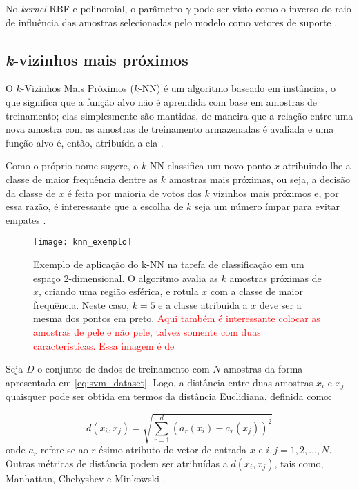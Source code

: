 No \emph{kernel} RBF e polinomial, o parâmetro $\gamma$ pode ser visto como o inverso do raio de influência das amostras selecionadas pelo modelo como vetores de suporte \citep{scikit-learn:11}.

\subsection{\emph{k}-vizinhos mais próximos}
\label{sec:clasificadores_knn}
O $k$-Vizinhos Mais Próximos ($k$-NN) é um algoritmo baseado em instâncias, o que significa que a função alvo não é aprendida com base em amostras de treinamento; elas simplesmente são mantidas, de maneira que a relação entre uma nova amostra com as amostras de treinamento armazenadas é avaliada e uma função alvo é, então, atribuída a ela \citep{mitchell:97}.

Como o próprio nome sugere, o $k$-NN classifica um novo ponto $x$ atribuindo-lhe a classe de maior frequência dentre as $k$ amostras mais próximas, ou seja, a decisão da classe de $x$ é feita por maioria de votos dos $k$ vizinhos mais próximos e, por essa razão, é interessante que a escolha de $k$ seja um número ímpar para evitar empates \citep{duda:12}.

\begin{figure}[!h]
  \centering
  \texttt{[image: knn\_exemplo]}
  \caption[Exemplo de aplicação do $k$-NN na tarefa de classificação em um espaço $2$-dimensional]{Exemplo de aplicação do k-NN na tarefa de classificação em um espaço $2$-dimensional. O algoritmo avalia as $k$ amostras próximas de $x$, criando uma região esférica, e rotula $x$ com a classe de maior frequência. Neste caso, $k = 5$ e a classe atribuída a $x$ deve ser a mesma dos pontos em preto. \textcolor{red}{Aqui também é interessante colocar as amostras de pele e não pele, talvez somente com duas características. Essa imagem é de \citep{duda:12}}}
  \label{fig:knn_exemplo}
\end{figure}

Seja $D$ o conjunto de dados de treinamento com $N$ amostras da forma apresentada em \ref{eq:svm_dataset}. Logo, a distância entre duas amostras $x_i$ e $x_j$ quaisquer pode ser obtida em termos da distância Euclidiana, definida como:

\begin{equation}
\label{eq:knn_distancia_euclidiana}
d(x_i, x_j) = \sqrt{\sum_{r=1}^d (a_r(x_i) - a_r(x_j))^2}
\end{equation}
\noindent onde $a_r$ refere-se ao $r$-ésimo atributo do vetor de entrada $x$ e $i, j = 1, 2, \ldots, N$. Outras métricas de distância podem ser atribuídas a $d(x_i, x_j)$, tais como, Manhattan, Chebyshev e Minkowski \citep{duda:12}.

